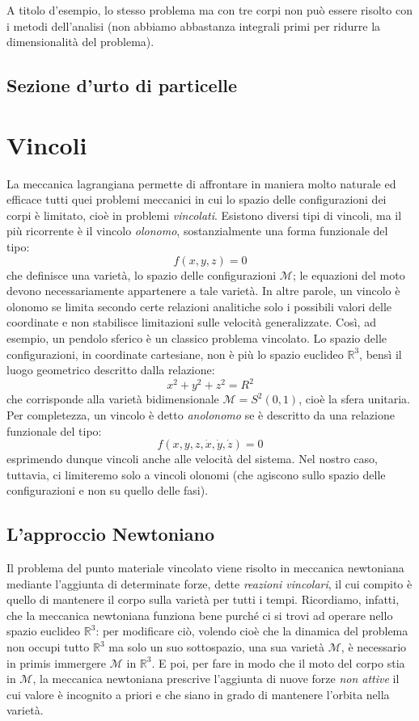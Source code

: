 \documentclass[a4paper,openany]{article}
\begin{document}
	A titolo d'esempio, lo stesso problema ma con tre corpi non può essere risolto con i metodi dell'analisi (non abbiamo abbastanza integrali primi per ridurre la dimensionalità del problema).
	\subsection{Sezione d'urto di particelle}
	
	
	\newpage
	\section{Vincoli}
	La meccanica lagrangiana permette di affrontare in maniera molto naturale ed efficace tutti quei problemi meccanici in cui lo spazio delle configurazioni dei corpi è limitato, cioè in problemi \textit{vincolati}. Esistono diversi tipi di vincoli, ma il più ricorrente è il vincolo \textit{olonomo}, sostanzialmente una forma funzionale del tipo:
	$$
	f(x,y,z) = 0
	$$
	che definisce una varietà, lo spazio delle configurazioni $\mathcal{M}$; le equazioni del moto devono necessariamente appartenere a tale varietà. In altre parole, un vincolo è olonomo se limita secondo certe relazioni analitiche solo i possibili valori delle coordinate e non stabilisce limitazioni sulle velocità generalizzate. Così, ad esempio, un pendolo sferico è un classico problema vincolato. Lo spazio delle configurazioni, in coordinate cartesiane, non è più lo spazio euclideo $\mathbb{R}^{3}$, bensì il luogo geometrico descritto dalla relazione:
	$$
	x^{2}+y^{2}+z^{2} = R^{2}
	$$
	che corrisponde alla varietà bidimensionale $\mathcal{M} = S^{2}(0,1)$, cioè la sfera unitaria. Per completezza, un vincolo è detto \textit{anolonomo} se è descritto da una relazione funzionale del tipo:
	$$
	f(x,y,z,\dot{x},\dot{y},\dot{z}) = 0
	$$
	esprimendo dunque vincoli anche alle velocità del sistema. Nel nostro caso, tuttavia, ci limiteremo solo a vincoli olonomi (che agiscono sullo spazio delle configurazioni e non su quello delle fasi).
	\subsection{L'approccio Newtoniano}
	Il problema del punto materiale vincolato viene risolto in meccanica newtoniana mediante l'aggiunta di determinate forze, dette \textit{reazioni vincolari}, il cui compito è quello di mantenere il corpo sulla varietà per tutti i tempi. Ricordiamo, infatti, che la meccanica newtoniana funziona bene purché ci si trovi ad operare nello spazio euclideo $\mathbb{R}^{3}$: per modificare ciò, volendo cioè che la dinamica del problema non occupi tutto $\mathbb{R}^{3}$ ma solo un suo sottospazio, una sua varietà $\mathcal{M}$, è necessario in primis immergere $\mathcal{M}$ in $\mathbb{R}^{3}$. E poi, per fare in modo che il moto del corpo stia in $\mathcal{M}$, la meccanica newtoniana prescrive l'aggiunta di nuove forze \textit{non attive} il cui valore è incognito a priori e che siano in grado di mantenere l'orbita nella varietà.
	
\end{document}
